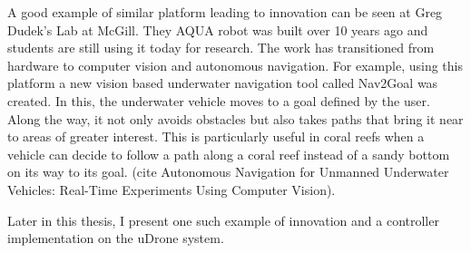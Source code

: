 A good example of similar platform leading to innovation can be seen at Greg Dudek’s Lab at McGill. They AQUA robot was built over 10 years ago and students are still using it today for research. The work has transitioned from hardware to computer vision and autonomous navigation. For example, using this platform a new vision based underwater navigation tool called Nav2Goal was created. In this, the underwater vehicle moves to a goal defined by the user. Along the way, it not only avoids obstacles but also takes paths that bring it near to areas of greater interest. This is particularly useful in coral reefs when a vehicle can decide to follow a path along a coral reef instead of a sandy bottom on its way to its goal. (cite Autonomous Navigation for Unmanned Underwater Vehicles: Real-Time Experiments Using Computer Vision).

Later in this thesis, I present one such example of innovation and a controller implementation on the uDrone system.



